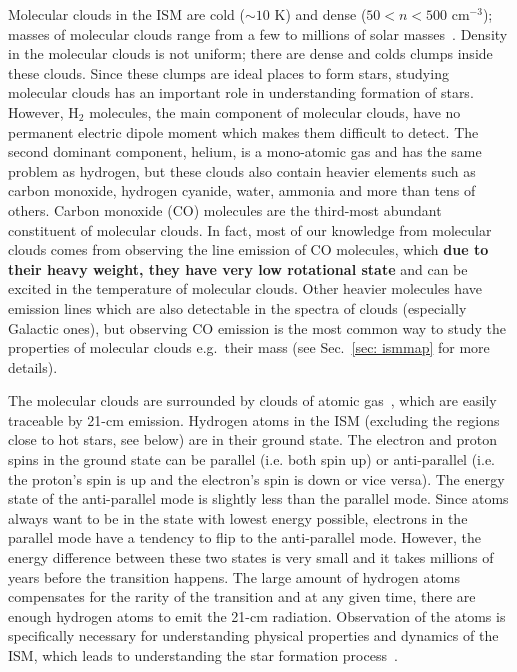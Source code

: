 Molecular clouds in the ISM are cold ($\sim10$ K) and dense ($ 50<n<500$ cm$^{-3}$); masses of molecular clouds range from a few to millions of solar masses~\citep{Bolato08}.
Density in the molecular clouds is not uniform; there are dense and colds clumps inside these clouds.
Since these clumps are ideal places to form stars, studying molecular clouds has an important role in understanding formation of stars.
However, H$_2$ molecules, the main component of molecular clouds, have no permanent electric dipole moment which makes them difficult to detect.
The second dominant component, helium, is a mono-atomic gas and has the same problem as hydrogen, but these clouds also contain heavier elements such as carbon monoxide, hydrogen cyanide, water, ammonia and more than tens of others.
Carbon monoxide (CO) molecules are the third-most abundant constituent of molecular clouds.
In fact, most of our knowledge from molecular clouds comes from observing the line emission of CO molecules, which {\bf due to their heavy weight, they have very low rotational state} and can be excited in the temperature of molecular clouds. %
Other heavier molecules have emission lines which are also detectable in the spectra of clouds (especially Galactic ones), but observing CO emission is the most common way to study the properties of molecular clouds e.g.\ their mass (see Sec.~\ref{sec: ismmap} for more details).

The molecular clouds are surrounded by clouds of atomic gas~\citep{Kennicutt12}, which are easily traceable by 21-cm emission.
Hydrogen atoms in the ISM (excluding the regions close to hot stars, see below) are in their ground state. 
The electron and proton spins in the ground state can be parallel (i.e. both spin up) or anti-parallel (i.e. the proton's spin is up and the electron's spin is down or vice versa). 
The energy state of the anti-parallel mode is slightly less than the parallel mode.
Since atoms always want to be in the state with lowest energy possible, electrons in the parallel mode have a tendency to flip to the anti-parallel mode. 
However, the energy difference between these two states is very small and it takes millions of years before the transition happens.
The large amount of hydrogen atoms compensates for the rarity of the transition and at any given time, there are enough hydrogen atoms to emit the 21-cm radiation. 
Observation of the \hi atoms is specifically necessary for understanding physical properties and dynamics of the ISM, which leads to understanding the star formation process~\citep{Walter08}.


